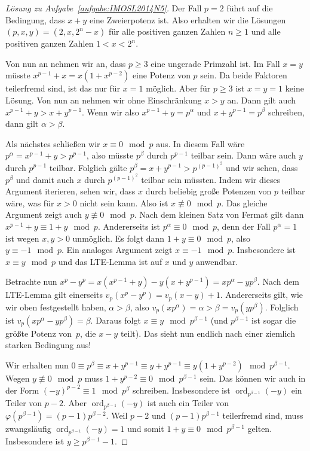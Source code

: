 \begin{proof}[Lösung zu Aufgabe~\ref{aufgabe:IMOSL2014N5}]
	Der Fall $p=2$ führt auf die Bedingung, dass $x+y$ eine Zweierpotenz ist. Also erhalten wir die Lösungen $(p,x,y)=(2,x,2^n-x)$ für alle positiven ganzen Zahlen $n\geqslant 1$ und alle positiven ganzen Zahlen $1<x<2^n$.
	
	Von nun an nehmen wir an, dass $p\geqslant 3$ eine ungerade Primzahl ist. Im Fall $x=y$ müsste $x^{p-1}+x=x(1+x^{p-2})$ eine Potenz von $p$ sein. Da beide Faktoren teilerfremd sind, ist das nur für $x=1$ möglich. Aber für $p\geqslant 3$ ist $x=y=1$ keine Lösung. Von nun an nehmen wir ohne Einschränkung $x>y$ an. Dann gilt auch $x^{p-1}+y>x+y^{p-1}$. Wenn wir also $x^{p-1}+y=p^\alpha$ und $x+y^{p-1}=p^\beta$ schreiben, dann gilt $\alpha>\beta$.
	
	Als nächstes schließen wir $x\equiv 0\mod p$ aus. In diesem Fall wäre $p^\alpha =x^{p-1}+y>p^{p-1}$, also müsste $p^\beta$ durch $p^{p-1}$ teilbar sein. Dann wäre auch $y$ durch $p^{p-1}$ teilbar. Folglich gälte $p^\beta =x+y^{p-1}>p^{(p-1)^2}$ und wir sehen, dass $p^\beta$ und damit auch $x$ durch $p^{(p-1)^2}$ teilbar sein müssten. Indem wir dieses Argument iterieren, sehen wir, dass $x$ durch beliebig große Potenzen von $p$ teilbar wäre, was für $x>0$ nicht sein kann. Also ist $x\not\equiv 0\mod p$. Das gleiche Argument zeigt auch $y\not\equiv 0\mod p$. Nach dem kleinen Satz von Fermat gilt dann $x^{p-1}+y\equiv 1+y\mod p$. Andererseits ist $p^\alpha\equiv 0\mod p$, denn der Fall $p^\alpha=1$ ist wegen $x,y>0$ unmöglich. Es folgt dann $1+y\equiv 0\mod p$, also $y\equiv -1\mod p$. Ein analoges Argument zeigt $x\equiv -1\mod p$. Insbesondere ist $x\equiv y\mod p$ und das LTE-Lemma ist auf $x$ und $y$ anwendbar.
	
	Betrachte nun $x^p-y^p=x(x^{p-1}+y)-y(x+y^{p-1})=xp^\alpha-yp^\beta$. Nach dem LTE-Lemma gilt einerseits $v_p(x^p-y^p)=v_p(x-y)+1$. Andererseits gilt, wie wir oben festgestellt haben, $\alpha>\beta$, also $v_p(xp^\alpha)=\alpha >\beta=v_p(yp^\beta)$. Folglich ist $v_p(xp^\alpha-yp^\beta)=\beta$. Daraus folgt $x\equiv y\mod p^{\beta-1}$ (und $p^{\beta-1}$ ist sogar die größte Potenz von~$p$, die $x-y$ teilt). Das sieht nun endlich nach einer ziemlich starken Bedingung aus!
	
	Wir erhalten nun $0\equiv p^\beta\equiv x+y^{p-1}\equiv y+y^{p-1}\equiv y(1+y^{p-2})\mod p^{\beta-1}$. Wegen $y\not\equiv 0\mod p$ muss $1+y^{p-2}\equiv 0\mod p^{\beta-1}$ sein. Das können wir auch in der Form $(-y)^{p-2}\equiv 1\mod p^\beta$ schreiben. Insbesondere ist $\operatorname{ord}_{p^{\beta-1}}(-y)$ ein Teiler von $p-2$. Aber $\operatorname{ord}_{p^{\beta-1}}(-y)$ ist auch ein Teiler von $\varphi(p^{\beta-1})=(p-1)p^{\beta-2}$. Weil $p-2$ und $(p-1)p^{\beta-1}$ teilerfremd sind, muss zwangsläufig $\operatorname{ord}_{p^{\beta-1}}(-y)=1$ und somit $1+y\equiv 0\mod p^{\beta-1}$ gelten. Insbesondere ist $y\geqslant p^{\beta-1}-1$.
	

\end{proof}

